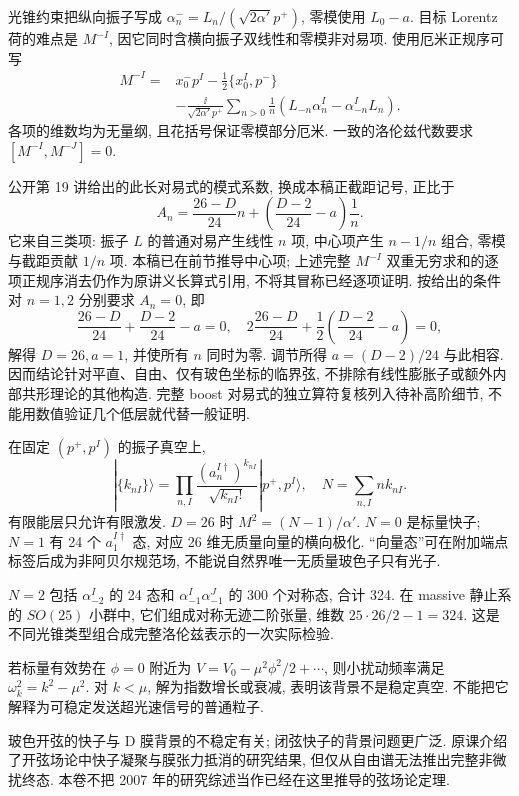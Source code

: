光锥约束把纵向振子写成 $\alpha_n^-=L_n/(\sqrt{2\alpha'}p^+)$, 零模使用 $L_0-a$. 目标 Lorentz 荷的难点是 $M^{-I}$, 因它同时含横向振子双线性和零模非对易项. 使用厄米正规序可写
\begin{align*}
 M^{-I}={}&x_0^-p^I-\tfrac12\{x_0^I,p^-\}\\
 &-\frac{\ii}{\sqrt{2\alpha'}p^+}
 \sum_{n>0}\frac1n( L_{-n}\alpha_n^I-\alpha_{-n}^IL_n).
\end{align*}
各项的维数均为无量纲, 且花括号保证零模部分厄米. 一致的洛伦兹代数要求 $[M^{-I},M^{-J}]=0$.

公开第 19 讲给出的此长对易式的模式系数, 换成本稿正截距记号, 正比于
\[
 A_n=\frac{26-D}{24}n+
 \left(\frac{D-2}{24}-a\right)\frac1n.
\]
它来自三类项: 振子 $L$ 的普通对易产生线性 $n$ 项, 中心项产生 $n-1/n$ 组合, 零模与截距贡献 $1/n$ 项. 本稿已在前节推导中心项; 上述完整 $M^{-I}$ 双重无穷求和的逐项正规序消去仍作为原讲义长算式引用, 不将其冒称已经逐项证明. 按给出的条件对 $n=1,2$ 分别要求 $A_n=0$, 即
\[
 \frac{26-D}{24}+\frac{D-2}{24}-a=0,
 \quad2\frac{26-D}{24}+\frac12\left(\frac{D-2}{24}-a\right)=0,
\]
解得 $D=26,a=1$, 并使所有 $n$ 同时为零. 调节所得 $a=(D-2)/24$ 与此相容. 因而结论针对平直、自由、仅有玻色坐标的临界弦, 不排除有线性膨胀子或额外内部共形理论的其他构造. 完整 boost 对易式的独立算符复核列入待补高阶细节, 不能用数值验证几个低层就代替一般证明.

在固定 $(p^+,p^I)$ 的振子真空上,
\[
 |\{k_{nI}\}\rangle=\prod_{n,I}\frac{(a_n^{I\dagger})^{k_{nI}}}{\sqrt{k_{nI}!}}
 |p^+,p^I\rangle,\quad N=\sum_{n,I}nk_{nI}.
\]
有限能层只允许有限激发. $D=26$ 时 $M^2=(N-1)/\alpha'$. $N=0$ 是标量快子; $N=1$ 有 24 个 $a_1^{I\dagger}$ 态, 对应 26 维无质量向量的横向极化. “向量态”可在附加端点标签后成为非阿贝尔规范场, 不能说自然界唯一无质量玻色子只有光子.

$N=2$ 包括 $\alpha_{-2}^I$ 的 24 态和 $\alpha_{-1}^I\alpha_{-1}^J$ 的 300 个对称态, 合计 324. 在 massive 静止系的 $SO(25)$ 小群中, 它们组成对称无迹二阶张量, 维数 $25\cdot26/2-1=324$. 这是不同光锥类型组合成完整洛伦兹表示的一次实际检验.

若标量有效势在 $\phi=0$ 附近为 $V=V_0-\mu^2\phi^2/2+\cdots$, 则小扰动频率满足 $\omega_k^2=k^2-\mu^2$. 对 $k<\mu$, 解为指数增长或衰减, 表明该背景不是稳定真空. 不能把它解释为可稳定发送超光速信号的普通粒子.

玻色开弦的快子与 D 膜背景的不稳定有关; 闭弦快子的背景问题更广泛. 原课介绍了开弦场论中快子凝聚与膜张力抵消的研究结果, 但仅从自由谱无法推出完整非微扰终态. 本卷不把 2007 年的研究综述当作已经在这里推导的弦场论定理.
